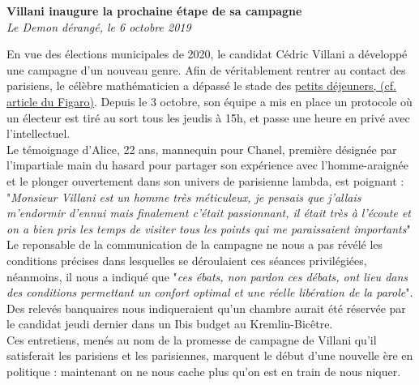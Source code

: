 \documentclass[french,12pt,amstex,a4paper]{article}
\begin{document}
\begin{center}
{\bf Villani inaugure la prochaine étape de sa campagne}\\
{\it Le Demon dérangé, le 6 octobre 2019}\\
\end{center}

En vue des élections municipales de 2020, le candidat Cédric Villani a développé une campagne d'un nouveau genre. Afin de véritablement rentrer au contact des parisiens, le célèbre mathématicien a dépassé le stade des \href{http://www.lefigaro.fr/elections/municipales/municipales-a-paris-villani-tire-au-sort-une-de-ses-soutiens-pour-un-petit-dejeuner-20191001}{petits déjeuners, (cf. article du Figaro)}. Depuis le 3 octobre, son équipe a mis en place un protocole où un électeur est tiré au sort tous les jeudis à 15h, et passe une heure en privé avec l'intellectuel.\\

Le témoignage d'Alice, 22 ans, mannequin pour Chanel, première désignée par l'impartiale main du hasard pour partager son expérience avec l'homme-araignée et le plonger ouvertement dans son univers de parisienne lambda, est poignant :\\

"{\it Monsieur Villani est un homme très méticuleux, je pensais que j'allais m'endormir d'ennui mais finalement c'était passionnant, il était très à l'écoute et on a bien pris les temps de visiter tous les points qui me paraissaient importants}"\\

Le reponsable de la communication de la campagne ne nous a pas révélé les conditions précises dans lesquelles se déroulaient ces séances privilégiées, néanmoins, il nous a indiqué que "{\it ces ébats, non pardon ces débats, ont lieu dans des conditions permettant un confort optimal et une réelle libération de la parole}". Des relevés banquaires nous indiqueraient qu'un chambre aurait été réservée par le candidat jeudi dernier dans un Ibis budget au Kremlin-Bicêtre.\\

Ces entretiens, menés au nom de la promesse de campagne de Villani qu'il satisferait les parisiens et les parisiennes, marquent le début d'une nouvelle ère en politique : maintenant on ne nous cache plus qu'on est en train de nous niquer.\\
\end{document}
